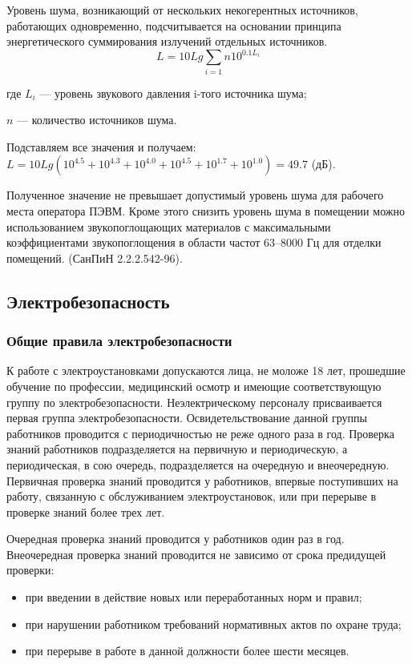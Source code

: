 Уровень шума, возникающий от нескольких некогерентных источников, работающих одновременно,
подсчитывается на основании принципа энергетического суммирования излучений отдельных источников.
\begin{equation}
L = 10 Lg\sum_{i=1}{n} 10^{0.1L_i}
\end{equation}
\begin{ESKDexplanation}
	\item[где ]{} $L_i$ --- уровень звукового давления i-того источника шума;
	\item{} $n$ --- количество источников шума.
\end{ESKDexplanation}
Подставляем все значения и получаем: $L = 10Lg (10^{4.5} + 10^{4.3} + 10^{4.0} + 10^{4.5} + 10^{1.7} + 10^{1.0}) = 49.7$ (дБ).

Полученное значение не превышает допустимый уровень шума для рабочего места оператора ПЭВМ.
Кроме этого снизить уровень шума в помещении  можно использованием звукопоглощающих материалов
с максимальными коэффициентами звукопоглощения в области частот 63--8000 Гц
для отделки помещений. (СанПиН 2.2.2.542-96).

\subsection{Электробезопасность}
\subsubsection{Общие правила электробезопасности}
К работе с электроустановками допускаются лица, не моложе 18 лет, прошедшие обучение по
профессии, медицинский осмотр и имеющие соответствующую группу по электробезопасности.
Неэлектрическому персоналу присваивается первая группа электробезопасности.
Освидетельствование данной группы работников проводится с периодичностью не реже одного раза в год.
Проверка знаний работников подразделяется на первичную и периодическую, а периодическая,
в сою очередь, подразделяется на очередную и внеочередную. Первичная
проверка знаний  проводится у работников, впервые поступивших на работу,
связанную с обслуживанием электроустановок, или при перерыве в проверке
знаний более трех лет.


Очередная проверка знаний проводится у работников один раз в год.
Внеочередная проверка знаний  проводится не зависимо от срока предидущей
проверки:
\begin{itemize}
	\item{} при введении в действие новых или переработанных норм и правил;
	\item{} при нарушении работником требований нормативных актов по охране труда;
	\item{} при перерыве в работе в данной должности более шести месяцев.
\end{itemize}

